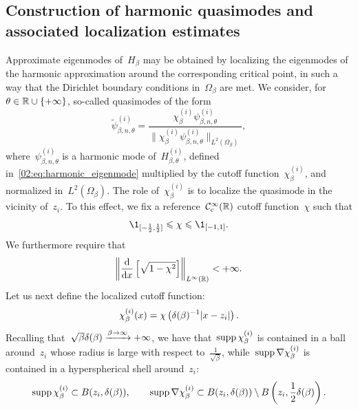     \subsection{Construction of harmonic quasimodes and associated localization estimates}\label{02:subsubsec:harm_quasimodes}
    Approximate eigenmodes of~$H_\beta$ may be obtained by localizing the eigenmodes of the harmonic approximation around the corresponding critical point, in such a way that the Dirichlet boundary conditions in~$\Omega_\beta$ are met.
    We consider, for~$\theta\in\mathbb{R}\cup\{+\infty\}$, so-called quasimodes of the form
    \begin{equation}
        \label{02:eq:harm_quasimode}
        \widetilde\psi^{(i)}_{\beta,n,\theta} = \frac{\chi_\beta^{(i)}\psi_{\beta,n,\theta}^{(i)}}{\|\chi_\beta^{(i)}\psi_{\beta,n,\theta}^{(i)}\|_{L^2(\Omega_\beta)}},
    \end{equation}
    where~$\psi_{\beta,n,\theta}^{(i)}$ is a harmonic mode of~$H_{\beta,\theta}^{(i)}$, defined in~\eqref{02:eq:harmonic_eigenmode} multiplied by the cutoff function~$\chi_\beta^{(i)}$, and normalized in~$L^2(\Omega_\beta)$.
    The role of~$\chi_\beta^{(i)}$ is to localize the quasimode in the vicinity of~$z_i$. To this effect, we fix a reference~$\mathcal{C}^\infty_{\mathrm{c}}(\mathbb{R})$ cutoff function~$\chi$ such that
    \begin{equation}
        \label{02:eq:reference_cutoff}
        \1_{[-\frac12,\frac12]} \leq \chi \leq \1_{[-1,1]}.
    \end{equation}
    We furthermore require that
    \begin{equation}
        \label{02:eq:partition_of_unity_condition}
        \left\|\frac{\mathrm{d}}{\mathrm{d} x}\left[\sqrt{1-\chi^2}\right]\right\|_{L^\infty(\mathbb{R})} < +\infty.
    \end{equation}
    Let us next define the localized cutoff function:
    \begin{equation}
        \label{02:eq:cutoff}
        \chi_\beta^{(i)}(x) = \chi\left(\delta(\beta)^{-1}|x-z_i|\right).
    \end{equation}
    Recalling that~$\sqrt\beta\delta(\beta)\xrightarrow{\beta\to\infty} + \infty$, we have that~$\mathrm{supp}\,\chi_\beta^{(i)}$ is contained in a ball around~$z_i$ whose radius is large with respect to~$\frac1{\sqrt\beta}$, while~$\mathrm{supp}\,\nabla \chi_\beta^{(i)}$ is contained in a hyperspherical shell around~$z_i$:
    \begin{equation}
        \label{02:eq:cutoff_supports}
        \mathrm{supp}\,\chi_\beta^{(i)} \subset B(z_i,\delta(\beta)),\qquad\mathrm{supp}\,\nabla\chi_\beta^{(i)} \subset B(z_i,\delta(\beta))\setminus B\left(z_i,\frac12\delta(\beta)\right).
    \end{equation}
